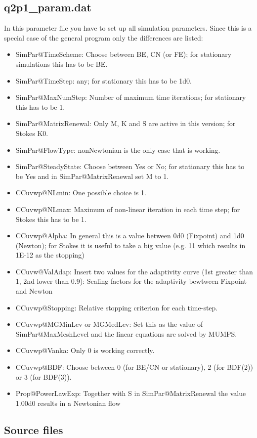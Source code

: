 \subsection{q2p1\_param.dat}
In this parameter file you have to set up all simulation parameters. Since this is a special case of the general program only the differences are listed:
\begin{itemize}
\item SimPar@TimeScheme: Choose between BE, CN (or FE); for stationary simulations this has to be BE.
\item SimPar@TimeStep: any; for stationary this has to be 1d0.
\item SimPar@MaxNumStep: Number of maximum time iterations; for stationary this has to be 1.
\item SimPar@MatrixRenewal: Only M, K and S are active in this version; for Stokes K0.
\item SimPar@FlowType: nonNewtonian is the only case that is working.
\item SimPar@SteadyState: Choose between Yes or No; for stationary this has to be Yes and in SimPar@MatrixRenewal set M to 1.
\item CCuvwp@NLmin: One possible choice is 1.
\item CCuvwp@NLmax: Maximum of non-linear iteration in each time step; for Stokes this has to be 1.
\item CCuvwp@Alpha: In general this is a value between 0d0 (Fixpoint) and 1d0 (Newton); for Stokes it is useful to take a big value (e.g. 11 which results in 1E-12 as the stopping)
\item CCuvw@ValAdap: Insert two values for the adaptivity curve (1st greater than 1, 2nd lower than 0.9): Scaling factors for the adaptivity bewtween Fixpoint and Newton
\item CCuvwp@Stopping: Relative stopping criterion for each time-step.
\item CCuvwp@MGMinLev or MGMedLev: Set this as the value of SimPar@MaxMeshLevel and the linear equations are solved by MUMPS.
\item CCuvwp@Vanka: Only 0 is working correctly.
\item CCuvwp@BDF: Choose between 0 (for BE/CN or stationary), 2 (for BDF(2)) or 3 (for BDF(3)).
\item Prop@PowerLawExp: Together with S in SimPar@MatrixRenewal the value 1.00d0 results in a Newtonian flow
\end{itemize}

\subsection{Source files}
